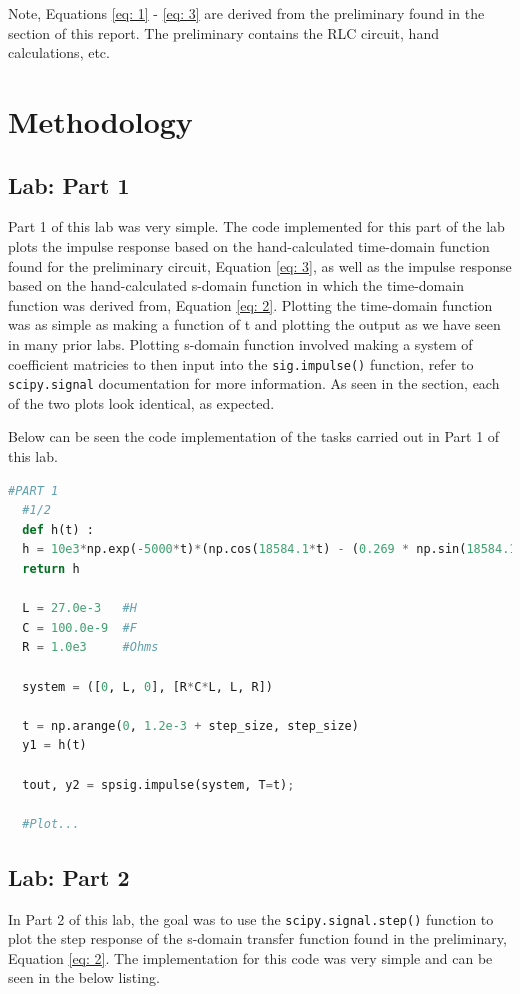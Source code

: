 \documentclass[12pt]{report}
\begin{document}
Note, Equations \eqref{eq: 1} - \eqref{eq: 3} are derived from the preliminary found in the  section of this report. The preliminary
contains the RLC circuit, hand calculations, etc.

\section{Methodology}
\subsection{Lab: Part 1}\label{Section: Part1}
Part 1 of this lab was very simple. The code implemented for this part of the lab plots the impulse response based on the hand-calculated time-domain function found
for the preliminary circuit, Equation \eqref{eq: 3}, as well as the impulse response based on the hand-calculated s-domain function in which the time-domain function
was derived from, Equation \eqref{eq: 2}. Plotting the time-domain function was as simple as making a function of t and plotting the output as we have seen in many
prior labs. Plotting s-domain function involved making a system of coefficient matricies to then input into the \texttt{sig.impulse()} function, refer to \texttt{scipy.signal}
documentation for more information. As seen in the  section, each of the two plots look identical, as expected.

Below can be seen the code implementation of the tasks carried out in Part 1 of this lab.

\begin{lstlisting}[language=Python, basicstyle=\footnotesize]
  #PART 1
  #1/2
  def h(t) :
  h = 10e3*np.exp(-5000*t)*(np.cos(18584.1*t) - (0.269 * np.sin(18584.1*t)))
  return h

  L = 27.0e-3   #H
  C = 100.0e-9  #F
  R = 1.0e3     #Ohms

  system = ([0, L, 0], [R*C*L, L, R])

  t = np.arange(0, 1.2e-3 + step_size, step_size)
  y1 = h(t)        

  tout, y2 = spsig.impulse(system, T=t);

  #Plot...
\end{lstlisting}

\subsection{Lab: Part 2}
In Part 2 of this lab, the goal was to use the \texttt{scipy.signal.step()} function to plot the step response of the s-domain transfer function found in the 
preliminary, Equation \eqref{eq: 2}. The implementation for this code was very simple and can be seen in the below listing.
\end{document}
